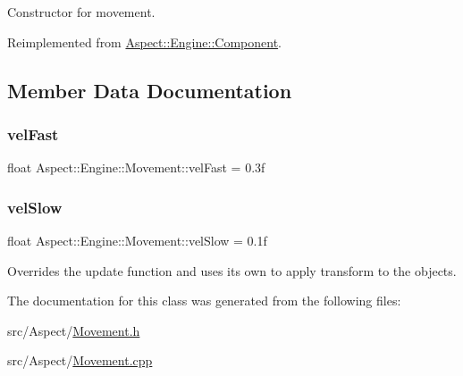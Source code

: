 Constructor for movement. 



Reimplemented from \mbox{\hyperlink{class_aspect_1_1_engine_1_1_component_a02de673a0591459bd0d39e3022c1d3fc}{Aspect\+::\+Engine\+::\+Component}}.



\subsection{Member Data Documentation}
\mbox{\label{class_aspect_1_1_engine_1_1_movement_a6e8ca164020a989058d53a4b0d735baf}} 
\subsubsection{\texorpdfstring{vel\+Fast}{velFast}}
{\footnotesize\ttfamily float Aspect\+::\+Engine\+::\+Movement\+::vel\+Fast = 0.\+3f}

\mbox{\label{class_aspect_1_1_engine_1_1_movement_af7975b02666fc826c7d57193d2230c77}} 
\subsubsection{\texorpdfstring{vel\+Slow}{velSlow}}
{\footnotesize\ttfamily float Aspect\+::\+Engine\+::\+Movement\+::vel\+Slow = 0.\+1f}



Overrides the update function and uses its own to apply transform to the objects. 



The documentation for this class was generated from the following files\+:\begin{DoxyCompactItemize}
\item 
src/\+Aspect/\mbox{\hyperlink{_movement_8h}{Movement.\+h}}\item 
src/\+Aspect/\mbox{\hyperlink{_movement_8cpp}{Movement.\+cpp}}\end{DoxyCompactItemize}
